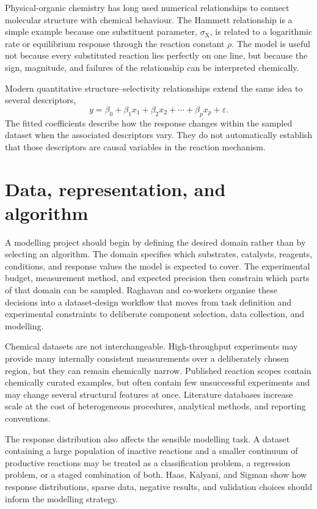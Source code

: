 Physical-organic chemistry has long used numerical relationships to connect molecular structure with chemical behaviour.
The Hammett relationship is a simple example because one substituent parameter, $\sigma_{\mathrm{X}}$, is related to a logarithmic rate or equilibrium response through the reaction constant $\rho$.
The model is useful not because every substituted reaction lies perfectly on one line, but because the sign, magnitude, and failures of the relationship can be interpreted chemically.

Modern quantitative structure--selectivity relationships extend the same idea to several descriptors,
\begin{equation}
  y=\beta_0+\beta_1x_1+\beta_2x_2+\cdots+\beta_px_p+\varepsilon.
\end{equation}
The fitted coefficients describe how the response changes within the sampled dataset when the associated descriptors vary.
They do not automatically establish that those descriptors are causal variables in the reaction mechanism.

\section{Data, representation, and algorithm}

A modelling project should begin by defining the desired domain rather than by selecting an algorithm.
The domain specifies which substrates, catalysts, reagents, conditions, and response values the model is expected to cover.
The experimental budget, measurement method, and expected precision then constrain which parts of that domain can be sampled.
Raghavan and co-workers organise these decisions into a dataset-design workflow that moves from task definition and experimental constraints to deliberate component selection, data collection, and modelling.

Chemical datasets are not interchangeable.
High-throughput experiments may provide many internally consistent measurements over a deliberately chosen region, but they can remain chemically narrow.
Published reaction scopes contain chemically curated examples, but often contain few unsuccessful experiments and may change several structural features at once.
Literature databases increase scale at the cost of heterogeneous procedures, analytical methods, and reporting conventions.

The response distribution also affects the sensible modelling task.
A dataset containing a large population of inactive reactions and a smaller continuum of productive reactions may be treated as a classification problem, a regression problem, or a staged combination of both.
Haas, Kalyani, and Sigman show how response distributions, sparse data, negative results, and validation choices should inform the modelling strategy.

